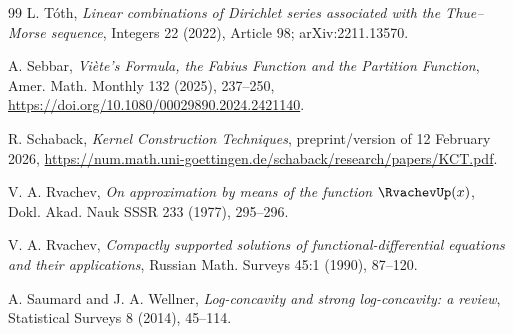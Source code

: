 \documentclass[11pt,oneside]{article}
\theoremstyle{definition}
\theoremstyle{remark}
\begin{document}
\begin{thebibliography}{99}
L. T\'oth,
\emph{Linear combinations of Dirichlet series associated with the Thue--Morse sequence},
Integers 22 (2022), Article 98; arXiv:2211.13570.

A. Sebbar,
\emph{Vi\`ete's Formula, the Fabius Function and the Partition Function},
Amer. Math. Monthly 132 (2025), 237--250,
\url{https://doi.org/10.1080/00029890.2024.2421140}.

R. Schaback,
\emph{Kernel Construction Techniques},
preprint/version of 12 February 2026,
\url{https://num.math.uni-goettingen.de/schaback/research/papers/KCT.pdf}.

V. A. Rvachev,
\emph{On approximation by means of the function $\RvachevUp(x)$},
Dokl. Akad. Nauk SSSR 233 (1977), 295--296.

V. A. Rvachev,
\emph{Compactly supported solutions of functional-differential equations and their applications},
Russian Math. Surveys 45:1 (1990), 87--120.

A. Saumard and J. A. Wellner,
\emph{Log-concavity and strong log-concavity: a review},
Statistical Surveys 8 (2014), 45--114.

\end{thebibliography}
\end{document}
